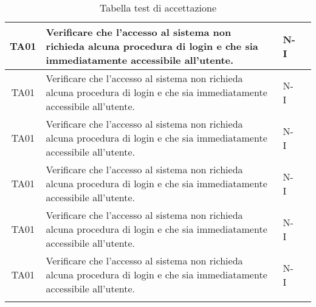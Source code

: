 \begin{longtable}{|c|p{5cm}|p{2cm}|c|}
    \hline
    TA01 & Verificare che l'accesso al sistema non richieda alcuna procedura di login e che sia immediatamente accessibile all'utente. & N-I \\
    \hline
    TA01 & Verificare che l'accesso al sistema non richieda alcuna procedura di login e che sia immediatamente accessibile all'utente. & N-I \\
    \hline
    TA01 & Verificare che l'accesso al sistema non richieda alcuna procedura di login e che sia immediatamente accessibile all'utente. & N-I \\
    \hline
    TA01 & Verificare che l'accesso al sistema non richieda alcuna procedura di login e che sia immediatamente accessibile all'utente. & N-I \\
    \hline
    TA01 & Verificare che l'accesso al sistema non richieda alcuna procedura di login e che sia immediatamente accessibile all'utente. & N-I \\
    \hline
    TA01 & Verificare che l'accesso al sistema non richieda alcuna procedura di login e che sia immediatamente accessibile all'utente. & N-I \\
    \hline
    \caption{Tabella test di accettazione}
    \label{tab:testsAccettazione}
    \end{longtable}




